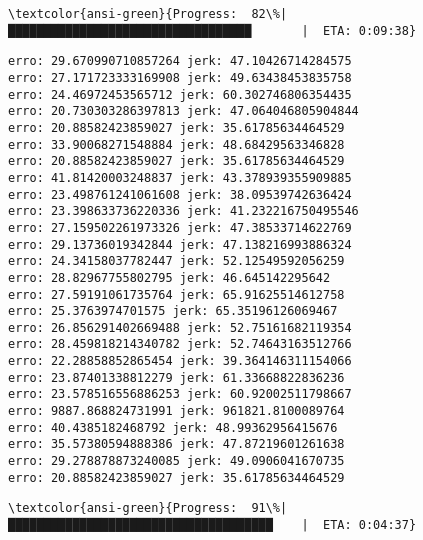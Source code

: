 \documentclass[11pt]{article}
\begin{document}
    \begin{Verbatim}[commandchars=\\\{\}]
\textcolor{ansi-green}{Progress:  82\%|██████████████████████████████████       |  ETA: 0:09:38}
    \end{Verbatim}

    \begin{Verbatim}[commandchars=\\\{\}]
erro: 29.670990710857264 jerk: 47.10426714284575
erro: 27.171723333169908 jerk: 49.63438453835758
erro: 24.46972453565712 jerk: 60.302746806354435
erro: 20.730303286397813 jerk: 47.064046805904844
erro: 20.88582423859027 jerk: 35.61785634464529
erro: 33.90068271548884 jerk: 48.68429563346828
erro: 20.88582423859027 jerk: 35.61785634464529
erro: 41.81420003248837 jerk: 43.378939355909885
erro: 23.498761241061608 jerk: 38.09539742636424
erro: 23.398633736220336 jerk: 41.232216750495546
erro: 27.159502261973326 jerk: 47.38533714622769
erro: 29.13736019342844 jerk: 47.138216993886324
erro: 24.34158037782447 jerk: 52.12549592056259
erro: 28.82967755802795 jerk: 46.645142295642
erro: 27.59191061735764 jerk: 65.91625514612758
erro: 25.3763974701575 jerk: 65.35196126069467
erro: 26.856291402669488 jerk: 52.75161682119354
erro: 28.459818214340782 jerk: 52.74643163512766
erro: 22.28858852865454 jerk: 39.364146311154066
erro: 23.87401338812279 jerk: 61.33668822836236
erro: 23.578516556886253 jerk: 60.92002511798667
erro: 9887.868824731991 jerk: 961821.8100089764
erro: 40.4385182468792 jerk: 48.99362956415676
erro: 35.57380594888386 jerk: 47.87219601261638
erro: 29.278878873240085 jerk: 49.0906041670735
erro: 20.88582423859027 jerk: 35.61785634464529

    \end{Verbatim}

    \begin{Verbatim}[commandchars=\\\{\}]
\textcolor{ansi-green}{Progress:  91\%|█████████████████████████████████████    |  ETA: 0:04:37}
    \end{Verbatim}
\end{document}
